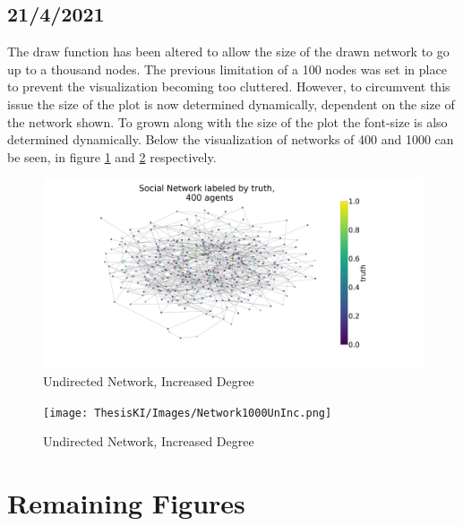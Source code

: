 \documentclass{article}
\begin{document}
\newpage

\subsection{21/4/2021}

The draw function has been altered to allow the size of the drawn network to go up to a thousand nodes. The previous limitation of a 100 nodes was set in place to prevent the visualization becoming too cluttered. However, to circumvent this issue the size of the plot is now determined dynamically, dependent on the size of the network shown. To grown along with the size of the plot the font-size is also determined dynamically. Below the visualization of networks of 400 and 1000 can be seen, in figure \ref{network_400:increased} and \ref{network_1000:increased} respectively.
\begin{center}
    \begin{figure}[!htbp]
        \centering
        \includegraphics[width=.8\textwidth]{ThesisKI/Images/Network400UnInc.png}
        \caption{Undirected Network, Increased Degree}
        \label{network_400:increased}
    \end{figure}
\end{center}

\begin{center}
    \begin{figure}[!htbp]
        \centering
        \texttt{[image: ThesisKI/Images/Network1000UnInc.png]}
        \caption{Undirected Network, Increased Degree}
        \label{network_1000:increased}
    \end{figure}
\end{center}

\newpage



\newpage

\section{Remaining Figures}
\end{document}
